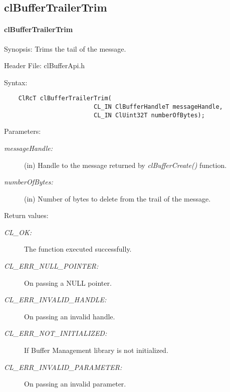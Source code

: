 \subsection{clBufferTrailerTrim}
\hypertarget{pagebuf125}{}\paragraph{cl\-Buffer\-Trailer\-Trim}\label{pagebuf125}
\begin{Desc}
\item[Synopsis:]Trims the tail of the message.\end{Desc}
\begin{Desc}
\item[Header File:]clBufferApi.h\end{Desc}
\begin{Desc}
\item[Syntax:]

\footnotesize\begin{verbatim}    ClRcT clBufferTrailerTrim(
                         CL_IN ClBufferHandleT messageHandle,
                         CL_IN ClUint32T numberOfBytes);
\end{verbatim}
\normalsize
\end{Desc}
\begin{Desc}
\item[Parameters:]
\begin{description}
\item[{\em message\-Handle:}](in) Handle to the message returned by \textit{clBufferCreate()} function. \item[{\em number\-Of\-Bytes:}](in) Number of bytes to delete from the trail of the message.\end{description}
\end{Desc}
\begin{Desc}
\item[Return values:]
\begin{description}
\item[{\em CL\_\-OK:}]The function executed successfully. \item[{\em CL\_\-ERR\_\-NULL\_\-POINTER:}]On passing a NULL pointer. \item[{\em CL\_\-ERR\_\-INVALID\_\-HANDLE:}]On passing an invalid handle. \item[{\em CL\_\-ERR\_\-NOT\_\-INITIALIZED:}]If Buffer Management library is not initialized. \item[{\em CL\_\-ERR\_\-INVALID\_\-PARAMETER:}]On passing an invalid parameter.\end{description}
\end{Desc}
